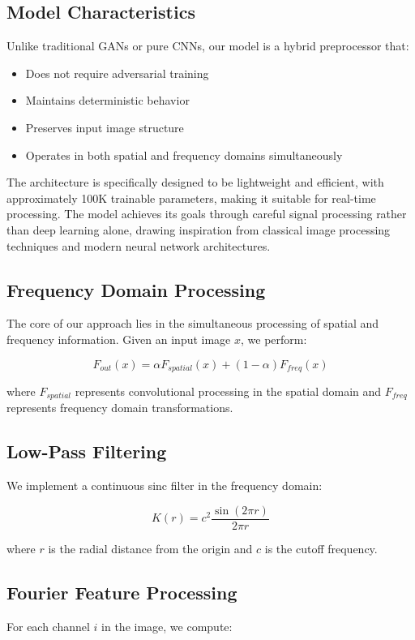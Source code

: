 \documentclass{article}
\begin{document}
\subsection{Model Characteristics}
Unlike traditional GANs or pure CNNs, our model is a hybrid preprocessor that:
\begin{itemize}
    \item Does not require adversarial training
    \item Maintains deterministic behavior
    \item Preserves input image structure
    \item Operates in both spatial and frequency domains simultaneously
\end{itemize}

The architecture is specifically designed to be lightweight and efficient, with approximately 100K trainable parameters, making it suitable for real-time processing. The model achieves its goals through careful signal processing rather than deep learning alone, drawing inspiration from classical image processing techniques and modern neural network architectures.

\subsection{Frequency Domain Processing}
The core of our approach lies in the simultaneous processing of spatial and frequency information. Given an input image $x$, we perform:

\begin{equation}
F_{out}(x) = \alpha F_{spatial}(x) + (1-\alpha)F_{freq}(x)
\end{equation}

where $F_{spatial}$ represents convolutional processing in the spatial domain and $F_{freq}$ represents frequency domain transformations.

\subsection{Low-Pass Filtering}
We implement a continuous sinc filter in the frequency domain:

\begin{equation}
K(r) = c^2 \frac{\sin(2\pi r)}{2\pi r}
\end{equation}

where $r$ is the radial distance from the origin and $c$ is the cutoff frequency.

\subsection{Fourier Feature Processing}
For each channel $i$ in the image, we compute:
\end{document}
